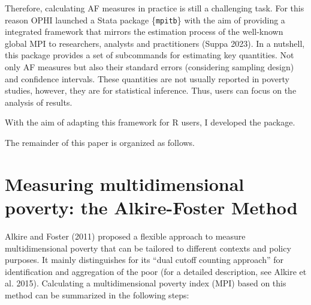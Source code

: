 Therefore, calculating AF measures in practice is still a challenging task. For this reason OPHI launched a Stata package \{\texttt{mpitb}\} with the aim of providing a integrated framework that mirrors the estimation process of the well-known global MPI to researchers, analysts and practitioners (Suppa 2023). In a nutshell, this package provides a set of subcommands for estimating key quantities. Not only AF measures but also their standard errors (considering sampling design) and confidence intervals. These quantities are not usually reported in poverty studies, however, they are for statistical inference. Thus, users can focus on the analysis of results.

With the aim of adapting this framework for R users, I developed the  package.

The remainder of this paper is organized as follows.

\hypertarget{measuring-multidimensional-poverty-the-alkire-foster-method}{%
\section{Measuring multidimensional poverty: the Alkire-Foster Method}\label{measuring-multidimensional-poverty-the-alkire-foster-method}}

Alkire and Foster (2011) proposed a flexible approach to measure multidimensional poverty that can be tailored to different contexts and policy purposes. It mainly distinguishes for its ``dual cutoff counting approach'' for identification and aggregation of the poor (for a detailed description, see Alkire et al. 2015). Calculating a multidimensional poverty index (MPI) based on this method can be summarized in the following steps:

